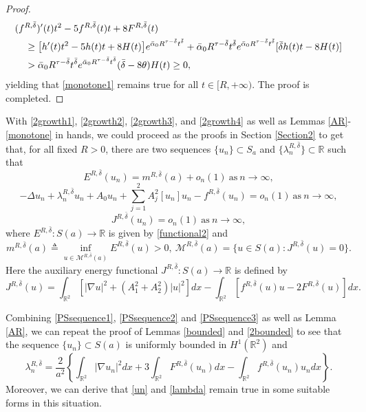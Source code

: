 \documentclass[11pt]{amsart}
\numberwithin{equation}{section}
\theoremstyle{definition}
\newcommand{\R}{\mathbb{R}}
\begin{document}
\begin{proof}
\[\begin{gathered}
  (f^{R,\bar{\delta}})^\prime(t)t^2-5f^{R,\bar{\delta}}(t)t+8F^{R,\bar{\delta}}(t) \hfill\\
  \ \ \ \    \geq  \big[h^\prime(t)t^2-5h(t)t+8H(t)\big]e^{\bar{\alpha}_0 R^{\tau-\bar{\delta}}t^{\bar{\delta}}}
+\bar{\alpha}_0  R^{\tau-\bar{\delta}}t^{\bar{\delta} }e^{\bar{\alpha}_0 R^{\tau-\bar{\delta}}t^{\bar{\delta} }}
[\bar{\delta} h(t)t-8H(t)]   \hfill\\
\ \ \ \  >\bar{\alpha}_0  R^{\tau-\bar{\delta}}t^{\bar{\delta} }e^{\bar{\alpha}_0 R^{\tau-\bar{\delta}}t^{\bar{\delta} }}
(\bar{\delta} -8\theta)H(t)\geq0,   \hfill\\
\end{gathered}\]
yielding that \eqref{monotone1} remains true for all $t\in[R,+\infty)$. The proof is completed.
\end{proof}


With \eqref{2growth1}, \eqref{2growth2}, \eqref{2growth3}, and \eqref{2growth4}
as well as Lemmas \ref{AR}-\ref{monotone}
 in hands, we could
proceed as the proofs in Section \ref{Section2} to get that,
for all fixed $R>0$, there are two sequences $\{u_n\}\subset S_a$ and $\{\lambda_n^{R,\bar{\delta}}\}\subset \R$ such that
\begin{equation}\label{PSsequence1}
  E^{R,\bar{\delta}}(u_n)=m^{R,\bar{\delta}}(a)+o_n(1)~\text{as}~n\to\infty,
\end{equation}
\begin{equation}\label{PSsequence2}
  -\Delta u_n+\lambda_n^{R,\bar{\delta}}u_n+ A_0u_n+\sum_{j=1}^2A_j^2[u_n] u_n- f^{R,\bar{\delta}}(u_n )
=o_n(1)~\text{as}~n\to\infty,
\end{equation}
\begin{equation}\label{PSsequence3}
J^{R,\bar{\delta}}(u_n)= o_n(1)~\text{as}~n\to\infty,
\end{equation}
where $E^{R,\bar{\delta}}:S(a)\to \R$ is given by \eqref{functional2} and
\begin{equation}\label{montainpassvalue}
  m^{R,\bar{\delta}}(a)\triangleq\inf_{u\in \mathcal{M}^{R,\bar{\delta}}(a)} E^{R,\bar{\delta}}(u)>0,
 ~\mathcal{M}^{R,\bar{\delta}}(a)=\big\{u\in S(a):J^{R,\bar{\delta}}(u)=0\big\}.
\end{equation}
Here the auxiliary energy functional $J^{R,\bar{\delta}}:S(a)\to\R$ is defined by
\[
J^{R,\bar{\delta}}(u)= \int_{\R^2}[|\nabla u|^2 + (A_1^2+A_2^2)|u|^2]dx-\int_{\R^2}[f^{R,\bar{\delta}}(u)u-2F^{R,\bar{\delta}}(u)]dx.
\]

 Combining
\eqref{PSsequence1}, \eqref{PSsequence2} and \eqref{PSsequence3}
as well as Lemma \ref{AR}, we can repeat the proof of Lemmas \ref{bounded} and \ref{2bounded}
to see that the sequence $\{u_n\}\subset S(a)$ is uniformly bounded in $H^1(\R^2)$ and
\begin{equation}\label{2bounded1}
\lambda_n^{R,\bar{\delta}}
=\frac2{a^2}\left\{\int_{\R^2} |\nabla u_n|^2  dx+3\int_{\R^2} F^{R,\bar{\delta}}(u_n)dx
-\int_{\R^2} f ^{R,\bar{\delta}}(u_n)u_ndx\right\}.
\end{equation}
Moreover, we can derive that \eqref{un} and \eqref{lambda}
 remain true in some suitable forms in this situation.
\end{document}

